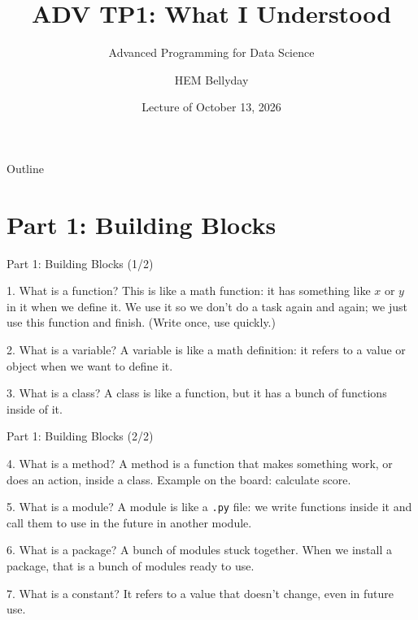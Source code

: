 \documentclass[aspectratio=169,11pt]{beamer}
\title[ADV TP1 Summary]{ADV TP1: What I Understood}
\subtitle{Advanced Programming for Data Science}
\author[HEM Bellyday]{HEM Bellyday}
\institute[ITC]{Department of Applied Mathematics and Statistics (AMS)\\
Institute of Technology of Cambodia (ITC)\\[2pt]
Lecturer: Mr.~VANN Visal}
\date{Lecture of October 13, 2026}
\begin{document}
\begin{frame}
  \titlepage
\end{frame}

\begin{frame}{Outline}
  \tableofcontents
\end{frame}

\section{Part 1: Building Blocks}

\begin{frame}{Part 1: Building Blocks (1/2)}
  \begin{block}{1. What is a function?}
    This is like a math function: it has something like $x$ or $y$ in it when we
    define it. We use it so we don't do a task again and again; we just use this
    function and finish. (Write once, use quickly.)
  \end{block}
  \begin{block}{2. What is a variable?}
    A variable is like a math definition: it refers to a value or object when we
    want to define it.
  \end{block}
  \begin{block}{3. What is a class?}
    A class is like a function, but it has a bunch of functions inside of it.
  \end{block}
\end{frame}

\begin{frame}{Part 1: Building Blocks (2/2)}
  \begin{block}{4. What is a method?}
    A method is a function that makes something work, or does an action, inside a
    class. Example on the board: calculate score.
  \end{block}
  \begin{block}{5. What is a module?}
    A module is like a \texttt{.py} file: we write functions inside it and call
    them to use in the future in another module.
  \end{block}
  \begin{block}{6. What is a package?}
    A bunch of modules stuck together. When we install a package, that is a bunch
    of modules ready to use.
  \end{block}
  \begin{block}{7. What is a constant?}
    It refers to a value that doesn't change, even in future use.
  \end{block}
\end{frame}
\end{document}
